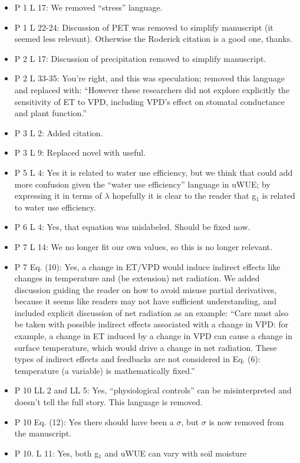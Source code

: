 \documentclass[12pt]{article}
\begin{document}
\begin{itemize}
\item P 1 L 17: We removed ``stress'' language.
\item P 1 L 22-24: Discussion of PET was removed to simplify
  manuscript (it seemed less relevant). Otherwise the Roderick
  citation is a good one, thanks.
\item P 2 L 17: Discussion of precipitation removed to simplify
  manuscript.
\item P 2 L 33-35: You're right, and this was speculation; removed
  this language and replaced with: ``However these researchers did not
  explore explicitly the sensitivity of ET to VPD, including VPD's
  effect on stomatal conductance and plant function.''
\item P 3 L 2: Added citation.
\item P 3 L 9: Replaced novel with useful.
\item P 5 L 4: Yes it is related to water use efficiency, but we think
  that could add more confusion given the ``water use efficiency''
  language in uWUE; by expressing it in terms of $\lambda$ hopefully
  it is clear to the reader that g$_1$ is related to water use
  efficiency.
\item P 6 L 4: Yes, that equation was mislabeled. Should be fixed now.
\item P 7 L 14: We no longer fit our own values, so this is no
  longer relevant.
\item P 7 Eq. (10): Yes, a change in ET/VPD would induce indirect
  effects like changes in temperature and (be extension) net
  radiation. We added discussion guiding the reader on how to avoid
  misuse partial derivatives, because it seems like readers may not
  have sufficient understanding, and included explicit discussion of
  net radiation as an example: ``Care must also be taken with possible
  indirect effects associated with a change in VPD: for example, a
  change in ET induced by a change in VPD can cause a change in
  surface temperature, which would drive a change in net
  radiation. These types of indirect effects and feedbacks are not
  considered in Eq. (6): temperature (a variable) is
  mathematically fixed.''
\item P 10 LL 2 and LL 5: Yes, ``physiological controls'' can be
  misinterpreted and doesn't tell the full story. This language is
  removed.
\item P 10 Eq. (12): Yes there should have been a $\sigma$, but
  $\sigma$ is now removed from the manuscript.
\item P 10. L 11: Yes, both g$_1$ and uWUE can vary with soil moisture

\end{itemize}
\end{document}
